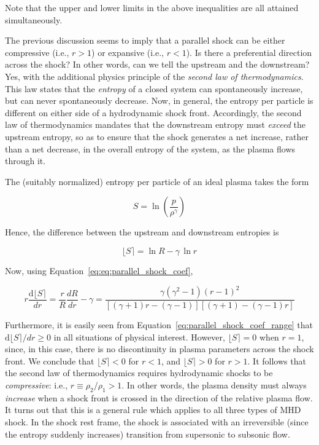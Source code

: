 \documentclass[
  notoc %
]{tufte-book}
\begin{document}
Note that the upper and lower limits in the above inequalities are all
attained simultaneously.

The previous discussion seems to imply that a parallel shock can be
either compressive (i.e., \(r>1\)) or expansive (i.e., \(r<1\)). Is
there a preferential direction across the shock? In other words, can we
tell the upstream and the downstream? Yes, with the additional physics
principle of the \emph{second law of thermodynamics}. This law states
that the \emph{entropy} of a closed system can spontaneously increase,
but can never spontaneously decrease. Now, in general, the entropy per
particle is different on either side of a hydrodynamic shock front.
Accordingly, the second law of thermodynamics mandates that the
downstream entropy must \emph{exceed} the upstream entropy, so as to
ensure that the shock generates a net increase, rather than a net
decrease, in the overall entropy of the system, as the plasma flows
through it.

The (suitably normalized) entropy per particle of an ideal plasma takes
the form

\[
S = \ln\left(\frac{p}{\rho^\gamma}\right)
\]

Hence, the difference between the upstream and downstream entropies is

\[
\lfloor S\rceil =\ln R - \gamma\,\ln r
\]

Now, using Equation~\ref{eq:eq:parallel_shock_coef},

\[
r\frac{\mathrm{d}\lfloor S \rceil}{dr} = \frac{r}{R}\frac{dR}{dr} - \gamma = \frac{\gamma(\gamma^2-1)(r-1)^2}{[(\gamma+1)r - (\gamma-1)][(\gamma+1)-(\gamma-1)r]}
\]

Furthermore, it is easily seen from
Equation~\ref{eq:parallel_shock_coef_range} that
\(\mathrm{d}\lfloor S \rceil/dr\ge 0\) in all situations of physical
interest. However, \(\lfloor S \rceil = 0\) when \(r=1\), since, in this
case, there is no discontinuity in plasma parameters across the shock
front. We conclude that \(\lfloor S \rceil<0\) for \(r<1\), and
\(\lfloor S \rceil>0\) for \(r>1\). It follows that the second law of
thermodynamics requires hydrodynamic shocks to be \emph{compressive}:
i.e., \(r\equiv\rho_2 / \rho_1>1\). In other words, the plasma density
must always \emph{increase} when a shock front is crossed in the
direction of the relative plasma flow. It turns out that this is a
general rule which applies to all three types of MHD shock. In the shock
rest frame, the shock is associated with an irreversible (since the
entropy suddenly increases) transition from supersonic to subsonic flow.
\end{document}
